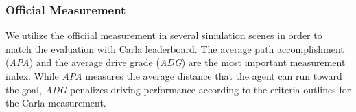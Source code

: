 \begin{table}
	\caption{Town05 outcomes based on offline measurements.
		Carla is used to evaluate all methods.
		3 experiment with various random seeds are used to calculate the mean values and standard deviations.
		Better performance is indicated by higher values for metrics marked with $\uparrow$, while lower are perferred for those marked with $\downarrow$.}
	\centering
	\label{tab:T5_results}
\end{table}

\subsubsection{Official Measurement}\label{lb_metrics}
\hspace{1pc}We utilize the officiial measurement in several simulation scenes in order to match the evaluation with Carla leaderboard\cite{Hu:2022}.
The average path accomplishment (\emph{APA}) and the average drive grade (\emph{ADG}) are the most important measurement index. 
While \emph{APA} measures the average distance that the agent can run toward the goal,
\emph{ADG} penalizes driving performance according to the criteria outlines for the Carla measurement.


